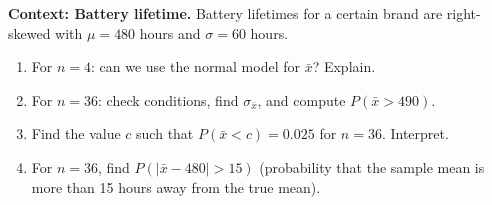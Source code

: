 \documentclass[10pt]{article}
\begin{document}
\vspace{0.12in}

\begin{tcolorbox}[colback=redbg, colframe=black!40, boxrule=0.6pt, arc=2mm,
    left=3mm, right=3mm, top=2mm, bottom=2mm, title=\textbf{Tier E --- Extension}]
\textbf{Context: Battery lifetime.}
Battery lifetimes for a certain brand are right-skewed with $\mu = 480$ hours and
$\sigma = 60$ hours.

\begin{enumerate}
  \item For $n = 4$: can we use the normal model for $\bar{x}$? Explain.
  \item For $n = 36$: check conditions, find $\sigma_{\bar{x}}$, and compute $P(\bar{x} > 490)$.
        \vspace{0.9in}
  \item Find the value $c$ such that $P(\bar{x} < c) = 0.025$ for $n = 36$. Interpret.
        \vspace{0.8in}
  \item For $n = 36$, find $P(|\bar{x} - 480| > 15)$ (probability that the sample mean
        is more than 15 hours away from the true mean).
        \vspace{0.9in}
\end{enumerate}
\end{tcolorbox}
\end{document}
